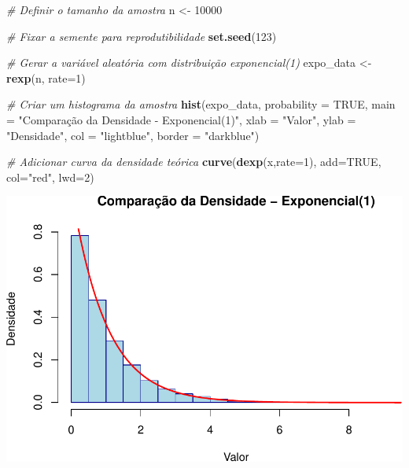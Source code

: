 \documentclass[
]{book}
\newenvironment{Shaded}{\begin{snugshade}}{\end{snugshade}}
\newcommand{\AttributeTok}[1]{\textcolor[rgb]{0.13,0.29,0.53}{#1}}
\newcommand{\CommentTok}[1]{\textcolor[rgb]{0.56,0.35,0.01}{\textit{#1}}}
\newcommand{\ConstantTok}[1]{\textcolor[rgb]{0.56,0.35,0.01}{#1}}
\newcommand{\DecValTok}[1]{\textcolor[rgb]{0.00,0.00,0.81}{#1}}
\newcommand{\FunctionTok}[1]{\textcolor[rgb]{0.13,0.29,0.53}{\textbf{#1}}}
\newcommand{\NormalTok}[1]{#1}
\newcommand{\OtherTok}[1]{\textcolor[rgb]{0.56,0.35,0.01}{#1}}
\newcommand{\StringTok}[1]{\textcolor[rgb]{0.31,0.60,0.02}{#1}}
\theoremstyle{definition}
\theoremstyle{definition}
\theoremstyle{definition}
\theoremstyle{definition}
\theoremstyle{remark}
\begin{document}
\begin{Shaded}
\begin{Highlighting}[]
\CommentTok{\# Definir o tamanho da amostra}
\NormalTok{n }\OtherTok{\textless{}{-}} \DecValTok{10000}

\CommentTok{\# Fixar a semente para reprodutibilidade}
\FunctionTok{set.seed}\NormalTok{(}\DecValTok{123}\NormalTok{)}

\CommentTok{\# Gerar a variável aleatória com distribuição exponencial(1)}
\NormalTok{expo\_data }\OtherTok{\textless{}{-}} \FunctionTok{rexp}\NormalTok{(n, }\AttributeTok{rate=}\DecValTok{1}\NormalTok{)}

\CommentTok{\# Criar um histograma da amostra }
\FunctionTok{hist}\NormalTok{(expo\_data, }\AttributeTok{probability =} \ConstantTok{TRUE}\NormalTok{, }
     \AttributeTok{main =} \StringTok{"Comparação da Densidade {-} Exponencial(1)"}\NormalTok{, }
     \AttributeTok{xlab =} \StringTok{"Valor"}\NormalTok{, }
     \AttributeTok{ylab =} \StringTok{"Densidade"}\NormalTok{, }
     \AttributeTok{col =} \StringTok{"lightblue"}\NormalTok{, }
     \AttributeTok{border =} \StringTok{"darkblue"}\NormalTok{)}

\CommentTok{\# Adicionar curva da densidade teórica}
\FunctionTok{curve}\NormalTok{(}\FunctionTok{dexp}\NormalTok{(x,}\AttributeTok{rate=}\DecValTok{1}\NormalTok{),}
      \AttributeTok{add=}\ConstantTok{TRUE}\NormalTok{,}
      \AttributeTok{col=}\StringTok{"red"}\NormalTok{,}
      \AttributeTok{lwd=}\DecValTok{2}\NormalTok{)}
\end{Highlighting}
\end{Shaded}

\includegraphics{meuLivro2_files/figure-latex/unnamed-chunk-125-1.pdf}
\end{document}
